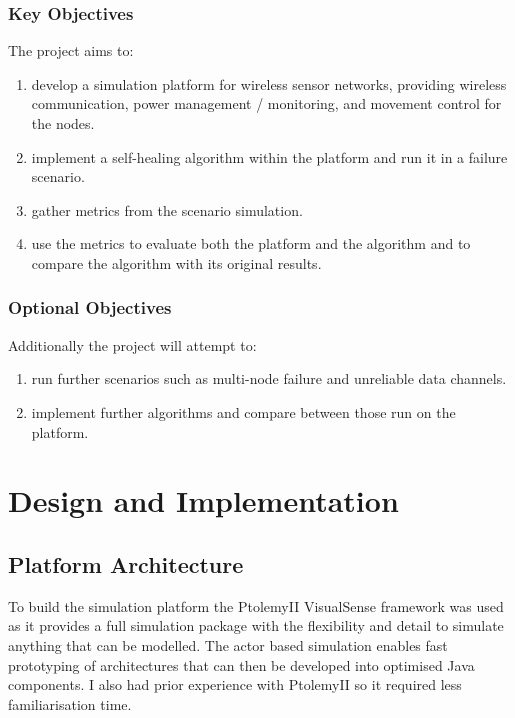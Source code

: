 \documentclass[authoryearcitations]{UoYCSproject}
\begin{document}
\subsection{Key Objectives}
The project aims to:
\begin{enumerate}
\item develop a simulation platform for wireless sensor networks, providing wireless communication, power management / monitoring, and movement control for the nodes.
\item implement a self-healing algorithm within the platform and run it in a failure scenario.
\item gather metrics from the scenario simulation.
\item use the metrics to evaluate both the platform and the algorithm and to compare the algorithm with its original results.
\end{enumerate}

\subsection{Optional Objectives}
Additionally the project will attempt to:
\begin{enumerate}
\item run further scenarios such as multi-node failure and unreliable data channels.
\item implement further algorithms and compare between those run on the platform.
\end{enumerate}

\chapter{Design and Implementation}

\section{Platform Architecture}

To build the simulation platform the PtolemyII VisualSense framework \citep{Baldwin2005} was used as it provides a full simulation package with the flexibility and detail to simulate anything that can be modelled. The actor based simulation enables fast prototyping of architectures that can then be developed into optimised Java components. I also had prior experience with PtolemyII so it required less familiarisation time.
\end{document}
